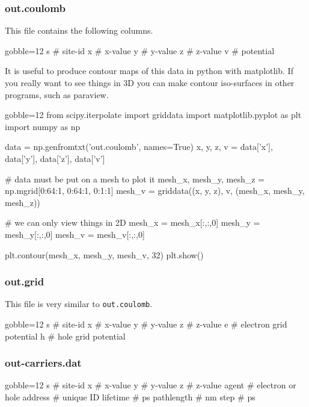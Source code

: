     \subsubsection{out.coulomb}
        This file contains the following columns.
        \begin{bashcode*}{gobble=12}
            s # site-id
            x # x-value
            y # y-value
            z # z-value
            v # potential
        \end{bashcode*}
        It is useful to produce contour maps of this data in python with
            matplotlib.
        If you really want to see things in 3D you can make contour iso-surfaces
            in other programs, such as paraview.            
        \begin{pythoncode*}{gobble=12}
            from scipy.iterpolate import griddata
            import matplotlib.pyplot as plt
            import numpy as np
            
            data = np.genfromtxt('out.coulomb', names=True)
            x, y, z, v = data['x'], data['y'], data['z'], data['v']
            
            # data must be put on a mesh to plot it
            mesh_x, mesh_y, mesh_z = np.mgrid[0:64:1, 0:64:1, 0:1:1]
            mesh_v = griddata((x, y, z), v, (mesh_x, mesh_y, mesh_z))
            
            # we can only view things in 2D
            mesh_x = mesh_x[:,:,0]
            mesh_y = mesh_y[:,:,0]
            mesh_v = mesh_v[:,:,0]
            
            plt.contour(mesh_x, mesh_y, mesh_v, 32)
            plt.show()
        \end{pythoncode*}

    \subsubsection{out.grid}
        This file is very similar to \texttt{out.coulomb}.
        \begin{bashcode*}{gobble=12}
            s # site-id
            x # x-value
            y # y-value
            z # z-value
            e # electron grid potential
            h # hole grid potential
        \end{bashcode*}

    \newpage
    \subsubsection{out-carriers.dat}
        \begin{bashcode*}{gobble=12}
            s          # site-id
            x          # x-value
            y          # y-value
            z          # z-value 
            agent      # electron or hole
            address    # unique ID
            lifetime   # ps
            pathlength # nm
            step       # ps
        \end{bashcode*}
    
